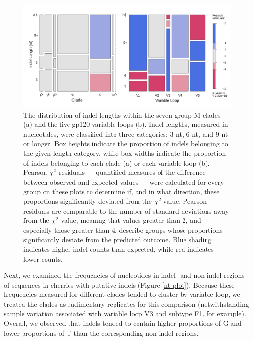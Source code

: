 \documentclass[12pt]{article}
\begin{document}
\begin{figure}[htbp]
    \centering
    \includegraphics[scale=0.37, trim={12mm 5mm 0 5mm},clip]{mosaic-combined3.pdf}
    \caption{
    The distribution of indel lengths within the seven group M clades (a) and the five gp120 variable loops (b). 
    Indel lengths, measured in nucleotides, were classified into three categories: 3 nt, 6 nt, and 9 nt or longer. 
    Box heights indicate the proportion of indels belonging to the given length category, while box widths indicate the proportion of indels belonging to each clade (a) or each variable loop (b).  
    Pearson $\chi^2$ residuals --- quantified measures of the difference between observed and expected values --- were calculated for every group on these plots to determine if, and in what direction, these proportions significantly deviated from the $\chi^2$ value. 
    Pearson residuals are comparable to the number of standard deviations away from the $\chi^2$ value, meaning that values greater than 2, and especially those greater than 4, describe groups whose proportions significantly deviate from the predicted outcome.
    Blue shading indicates higher indel counts than expected, while red indicates lower counts.
    }
    \label{mosaic}
\end{figure}

Next, we examined the frequencies of nucleotides in indel- and non-indel regions of sequences in cherries with putative indels (Figure \ref{nt-plot}).  
Because these frequencies measured for different clades tended to cluster by variable loop, we treated the clades as rudimentary replicates for this comparison (notwithstanding sample variation associated with variable loop V3 and subtype F1, for example).
Overall, we observed that indels tended to contain higher proportions of G and lower proportions of T than the corresponding non-indel regions.
\end{document}
